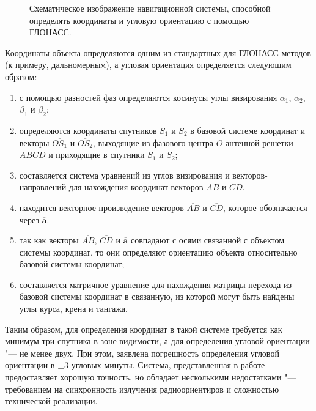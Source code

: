 \documentclass[../main.tex]{subfiles}
\begin{document}
\begin{figure}[tb]
    \begin{center}


    \caption{Схематическое изображение навигационной системы, способной определять координаты и угловую ориентацию с помощью ГЛОНАСС.}
    \label{fig:glonass:pic2}
    \end{center}
\end{figure}

Координаты объекта определяются одним из стандартных для ГЛОНАСС методов (к примеру, дальномерным), а угловая ориентация определяется следующим образом:
\begin{enumerate}
    \item с помощью разностей фаз определяются косинусы углы визирования $\alpha_1$, $\alpha_2$, $\beta_1$ и $\beta_2$;
    \item определяются координаты спутников $S_1$ и $S_2$ в базовой системе координат и векторы $\overline{OS_1}$ и $\overline{OS_2}$, выходящие из фазового центра $O$ антенной решетки $ABCD$ и приходящие в спутники $S_1$ и $S_2$;
    \item составляется система уравнений из углов визирования и векторов-направлений для нахождения координат векторов $\overline{AB}$ и $\overline{CD}$.
    \item находится векторное произведение векторов $\overline{AB}$ и $\overline{CD}$, которое обозначается через $\overline{\mathbf{a}}$.
    \item так как векторы  $\overline{AB}$, $\overline{CD}$ и $\overline{\mathbf{a}}$ совпадают с осями связанной с объектом системы координат, то они определяют ориентацию объекта относительно базовой системы координат;
    \item составляется матричное уравнение для нахождения матрицы перехода из базовой системы координат в связанную, из которой могут быть найдены углы курса, крена и тангажа.
\end{enumerate}
Таким образом, для определения координат в такой системе требуется как минимум три спутника в зоне видимости, а для определения угловой ориентации "--- не менее двух. При этом, заявлена погрешность определения угловой ориентации в $\pm 3$ угловых минуты. Система, представленная в работе~\cite{STEPANOV:2006} предоставляет хорошую точность, но обладает несколькими недостатками "--- требованием на синхронность излучения радиоориентиров и сложностью технической реализации.
\end{document}
